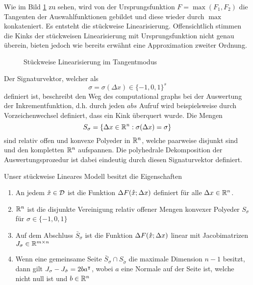 Wie im Bild \ref{fig:piecewiseLinearization} zu sehen, wird von der  Ursprungsfunktion $F = \max(F_1,F_2)$ die Tangenten der Auswahlfunktionen gebildet und diese wieder durch $\max$ konkateniert. Es entsteht die stückweise Linearisierung. Offensichtlich stimmen die Kinks der stückweisen Linearisierung mit Ursprungsfunktion nicht genau überein, bieten jedoch wie bereits erwähnt eine Approximation zweiter Ordnung. 

\begin{figure}
\centering
 
 \caption{Stückweise Linearisierung im Tangentmodus}
\label{fig:piecewiseLinearization} 
\end{figure}


Der Signaturvektor, welcher als 
\[
 \sigma = \sigma(\Delta x) \in \lbrace -1,0,1\rbrace^s
\]
definiert ist, beschreibt den Weg des computational graphs bei der Auswertung der Inkrementfunktion, d.h. durch jeden $abs$ Aufruf wird beispielsweise durch Vorzeichenwechsel definiert, dass ein Kink überquert wurde. Die Mengen 
\[
 S_\sigma = \lbrace \Delta x \in \mathbb{R}^n:\sigma(\Delta x) = \sigma \rbrace
\]
sind relativ offen und konvexe Polyeder in $\mathbb{R}^n$, welche paarweise disjunkt sind und den kompletten $\mathbb{R}^n$ aufspannen.
Die polyhedrale Dekomposition der Auswertungsprozedur ist dabei eindeutig durch diesen Signaturvektor definiert.

Unser stückweise Lineares Modell besitzt die Eigenschaften
\cite[Prop. 2]{monster}
\begin{theorem}
 \begin{enumerate}
  \item An jedem $\mathring{x}\in \mathcal D$ ist die Funktion $\Delta F(\mathring{x};\Delta x)$ definiert für alle $\Delta x\in \mathbb{R}^n$.
  \item $\mathbb{R}^n$ ist die disjunkte Vereinigung relativ offener Mengen konvexer Polyeder $S_\sigma$ für $\sigma \in \lbrace -1,0,1\rbrace$
  \item Auf dem Abschluss $\bar S_\sigma$ ist die Funktion $\Delta F(\mathring{x};\Delta x)$ linear mit Jacobimatrizen $J_\sigma\in \mathbb{R}^{m\times n}$
  \item Wenn eine gemeinsame Seite $\bar S_\sigma \cap S_{\tilde \sigma}$ die maximale Dimension $n-1$ besitzt, dann gilt $J_\sigma - J_{\tilde \sigma} = 2ba^\intercal$, wobei $a$ eine Normale auf der Seite ist, welche nicht null ist und $b\in \mathbb{R}^n$
 \end{enumerate}
\end{theorem}



